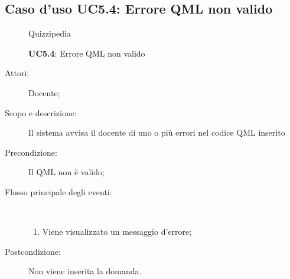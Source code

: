 \subsection{Caso d'uso UC5.4: Errore QML non valido}
	\begin{figure}[H]
		\centering
		\begin{resizedtikzpicture}{\textwidth}
		\begin{umlsystem}[x=0, fill=lightgray!20]{Quizzipedia}
		\end{umlsystem}
		\end{resizedtikzpicture}
		\caption{\textbf{UC5.4}: Errore QML non valido}
		\label{UC5.4}
	\end{figure}
\begin{description}
\item[Attori:] Docente;
\item[Scopo e descrizione:] Il sistema avvisa il docente di uno o più errori nel codice QML inserito
      \item[Precondizione:] Il QML non è valido;

        \item[Flusso principale degli eventi:] \ 
 \begin{enumerate}
          \item Viene visualizzato un messaggio d'errore;

      \end{enumerate}
    \item[Postcondizione:] Non viene inserita la domanda.
  \end{description}
\hypertarget{UC5.5}{}
